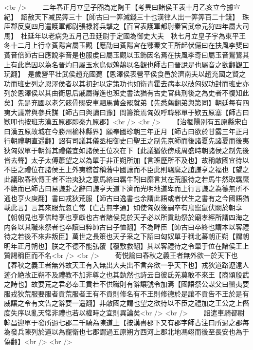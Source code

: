 <br />
　　二年春正月立皇子嚻為定陶王【考異曰諸侯王表十月乙亥立今據宣紀】　詔赦天下减民筭三十【師古曰一筭減錢三十也漢律人出一筭筭百二十錢】　珠厓郡反夏四月遣護軍都尉張禄將兵擊之【百官表護軍都尉秦官武帝元狩四年屬大司馬】　杜延年以老病免五月己丑廷尉于定國為御史大夫　秋七月立皇子宇為東平王　冬十二月上行幸萯陽宫屬玉觀【應劭曰萯陽宮在鄠秦文王所起伏儼曰在扶風李斐曰萯音倍師古曰應說李音是也服䖍曰屬玉觀以玉飾因名焉在扶風李奇曰屬玉音鸑鷟其上有此烏因以為名晉灼曰屬玉水鳥似鵁鶄以名觀也師古曰晉說是也屬音之欲翻觀工玩翻】　是歲營平壮武侯趙充國薨【恩澤侯表營平侯食邑於濟南夫以趙充國之賢之功而班史列之恩澤侯者以其初封以定策功也如衛青霍去病本以破匈奴功封而班史亦列於恩澤侯以其由衛思后戚屬得進也班史書法猶有古史官典刑後之為史者不復知此矣】先是充國以老乞骸骨賜安車駟馬黄金罷就弟【先悉薦翻弟與第同】朝廷每有四夷大議常與參兵謀【師古曰與讀曰豫】問籌策焉匈奴呼韓邪單于欵五原塞【師古曰欵叩也按班志漢五原郡即秦九原郡】<br />
<br />
　　【治稒陽别有五原縣宋白曰漢五原故城在今勝州榆林縣界】願奉國珍朝三年正月【師古曰欲於甘露三年正月行朝禮朝直遥翻】詔有司議其儀丞相御史曰聖王之制先京師而後諸夏先諸夏而後夷狄匈奴單于朝賀其禮儀宜如諸侯王位次在下【此議猶依傍成周盛時朝諸侯之制先後皆去聲】太子太傅蕭望之以為單于非正朔所加【言班歷所不及也】故稱敵國宜待以不臣之禮位在諸侯王上外夷稽首稱藩中國讓而不臣此則羈縻之誼謙亨之福也【望之此議取春秋傳王者不治夷狄之意馬絡曰羈牛靷曰縻言其在荒服待之若馬牛然取羈縻不絶而已師古曰易謙卦之辭曰謙亨天道下濟而光明地道卑而上行言謙之為德無所不通也亨火庚翻】書曰戎狄荒服【師古曰逸書也余謂此語或者伏生之書有之今國語猶載此言】言其來服荒忽亡常【亡古無字通】如使匈奴後嗣卒有鳥竄鼠伏闕於朝享【朝朝見也享供時享也享獻也古者諸侯見於天子必以所貢助祭於廟孝經所謂四海之内各以其職來祭者也卒讀曰粹師古曰子恤翻】不為畔臣【師古曰卒終也謂本以客禮待之若後不來非叛臣】萬世之長策也天子采之下詔曰匈奴單于稱北蕃朝正朔【謂朝明年正月朔也】朕之不德不能弘覆【覆敷救翻】其以客禮待之令單于位在諸侯王上贊謁稱臣而不名<br />
<br />
　　荀悦論曰春秋之義王者無外欲一於天下也【春秋之義王者無外故天王有入無出大夫出不言奔欲一乎天下也】戎狄道路遼遠人迹介絶故正朔不及禮教不加非尊之也其埶然也詩云自彼氐羌莫敢不來王【商頌殷武之詩也】故要荒之君必奉王貢若不供職則有辭讓號令加焉【國語祭公謀父曰蠻夷要服戎狄荒服要服者貢荒服者王有不貢則修名有不王則修德於是讓不貢告不王於是有威讓之令有文告之辭要一遥翻】非敵國之謂也望之欲待以不臣之禮加之王公之上僭度失序以亂天常非禮也若以權時之宜則異論矣<br />
<br />
　　詔遣車騎都尉韓昌迎單于發所過七郡二千騎為陳道上【按漢書郡下又有郡字師古注曰所過之郡每為發兵陳列於道以為寵衛也七郡謂過五原朔方西河上郡北地馮翊而後至長安也為于偽翻】<br />
<br />
